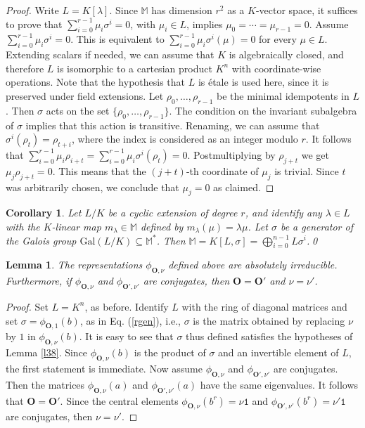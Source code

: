 \documentclass{article}
\newtheorem{lem}[prop]{Lemma}
\newtheorem{cor}{Corollary}[prop]
\theoremstyle{definition}
\begin{document}
\begin{proof}
    Write $L=K[\lambda]$. Since $\mathbb{M}$ has dimension $r^2$ as 
    a $K$-vector space, it suffices to prove that 
    $\sum_{i=0}^{r-1}\mu_i\sigma^i=0$, with $\mu_i\in L$, implies
    $\mu_0=\cdots=\mu_{r-1}=0$. Assume 
    $\sum_{i=0}^{r-1}\mu_i\sigma^i=0$. This is equivalent to
    $\sum_{i=0}^{r-1}\mu_i\sigma^i(\mu)=0$ for every $\mu\in L$.
    Extending scalars if needed, we can assume that $K$ is 
    algebraically closed, and therefore $L$ is isomorphic to a cartesian
    product $K^n$ with coordinate-wise operations. Note that the 
    hypothesis that $L$ is \'etale is used here, since it is preserved
    under field extensions. Let $\rho_0,\dots,\rho_{r-1}$ be the minimal 
    idempotents in $L$. Then $\sigma$ acts on the set 
    $\{\rho_0,\dots,\rho_{r-1}\}$. The condition on the invariant subalgebra of 
    $\sigma$ implies that this action is transitive. Renaming, we can assume that
    $\sigma^i(\rho_t)=\rho_{t+i}$, where the index is considered as an integer 
    modulo $r$. It follows that $\sum_{i=0}^{r-1}\mu_i\rho_{i+t}=
    \sum_{i=0}^{r-1}\mu_i\sigma^i(\rho_t)=0$. Postmultiplying by $\rho_{j+t}$ we 
    get $\mu_j\rho_{j+t}=0$. This means that the $(j+t)$-th coordinate of $\mu_j$
    is trivial. Since $t$ was arbitrarily chosen, we conclude that  $\mu_j=0$ as
    claimed.  
\end{proof}

\begin{cor}\label{c211}
    Let $L/K$ be a cyclic extension of degree $r$, 
    and identify any $\lambda\in L$
    with the $K$-linear map $m_\lambda\in \mathbb{M}$
    defined by $m_\lambda(\mu)=\lambda\mu$. Let $\sigma$
    be a generator of the Galois group 
    $\mathrm{Gal}(L/K)\subseteq \mathbb{M}^*$. Then
    $\mathbb{M}=K[L,\sigma]=\bigoplus_{i=0}^{n-1}L\sigma^i$.\qed
\end{cor}

\begin{lem}
    The representations $\phi_{\mathbf{O},\nu}$ defined above
    are absolutely irreducible. Furthermore, if $\phi_{\mathbf{O},\nu}$ 
    and $\phi_{\mathbf{O}',\nu'}$ are conjugates, then
    $\mathbf{O}=\mathbf{O}'$ and $\nu=\nu'$.
\end{lem}

\begin{proof}
  Set $L=K^n$, as before.
  Identify $L$ with the ring of diagonal matrices and set
  $\sigma=\phi_{\mathbf{O},1}(b)$, as in Eq. (\ref{rgen}), i.e., $\sigma$
  is the matrix obtained by replacing $\nu$ by $1$ in $\phi_{\mathbf{O},\nu}(b)$.
  It is easy to see that $\sigma$ thus defined satisfies the hypotheses of Lemma
  \ref{l38}. Since $\phi_{\mathbf{O},\nu}(b)$ is the product of $\sigma$
  and an invertible element of $L$, the first statement is immediate. Now 
  assume $\phi_{\mathbf{O},\nu}$ and $\phi_{\mathbf{O}',\nu'}$ are conjugates. 
  Then the matrices $\phi_{\mathbf{O},\nu}(a)$ and $\phi_{\mathbf{O}',\nu'}(a)$
  have the same eigenvalues. It follows that $\mathbf{O}=\mathbf{O}'$.
  Since the central elements $\phi_{\mathbf{O},\nu}(b^r)=\nu\mathtt{1}$ and
  $\phi_{\mathbf{O}',\nu'}(b^r)=\nu'\mathtt{1}$ are conjugates, then $\nu=\nu'$.
\end{proof}
\end{document}
